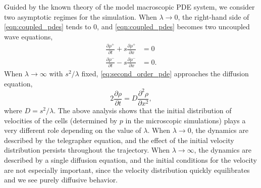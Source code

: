 \documentclass[3p]{elsarticle}
\begin{document}
Guided by the known theory of the model macroscopic PDE system, we consider two asymptotic regimes for the simulation.
%
When $\lambda \rightarrow 0$, the right-hand side of \eqref{eqn:coupled_pdes} tends to 0, and \eqref{eqn:coupled_pdes} becomes two uncoupled wave equations,
\begin{equation}
\begin{aligned}
\frac{\partial \rho^+}{\partial t} + s \frac{\partial \rho^+}{\partial x} & = 0 \\
\frac{\partial \rho^-}{\partial t} - s \frac{\partial \rho^-}{\partial x} & = 0.
\end{aligned}
\end{equation}
%
When $\lambda \rightarrow \infty$ with $s^2/\lambda$ fixed, \eqref{eq:second_order_pde} approaches the diffusion equation,
\begin{equation} \label{eq:diff_eqn}
2 \frac{\partial \rho}{\partial t} = D \frac{\partial ^2 \rho}{\partial x^2},
\end{equation}
%
where $D=s^2/\lambda$.
%
The above analysis shows that the initial distribution of velocities of the cells 
(determined by $p$ in the microscopic simulations) plays a very different role depending on the value of $\lambda$.
%
When $\lambda \rightarrow 0$, the dynamics are described by the telegrapher equation, and the effect of the initial velocity distribution 
persists throughout the trajectory.
%
When $\lambda \rightarrow \infty$, the dynamics are described by a single diffusion equation, and the initial conditions 
for the velocity are not especially important, since the velocity distribution quickly equilibrates and we see purely diffusive behavior.
\end{document}
